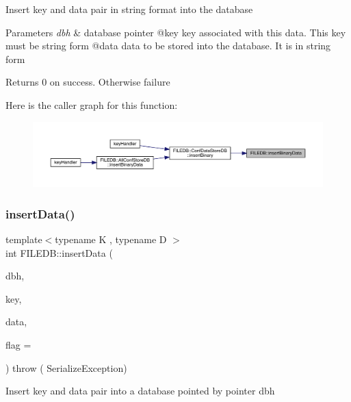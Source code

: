 Insert key and data pair in string format into the database


\begin{DoxyParams}{Parameters}
{\em dbh} & database pointer @key key associated with this data. This key must be string form @data data to be stored into the database. It is in string form\\
\hline
\end{DoxyParams}
\begin{DoxyReturn}{Returns}
0 on success. Otherwise failure 
\end{DoxyReturn}
Here is the caller graph for this function\+:
\nopagebreak
\begin{figure}[H]
\begin{center}
\leavevmode
\includegraphics[width=350pt]{d2/de6/namespaceFILEDB_a517749615adc5aa798175fb429115366_icgraph}
\end{center}
\end{figure}
\mbox{\label{namespaceFILEDB_a63f788f0f11a571f254ac8cfa8d19132}} 
\subsubsection{\texorpdfstring{insertData()}{insertData()}\hspace{0.1cm}{\footnotesize\ttfamily [1/2]}}
{\footnotesize\ttfamily template$<$typename K , typename D $>$ \\
int F\+I\+L\+E\+D\+B\+::insert\+Data (\begin{DoxyParamCaption}\item[{\mbox{\hyperlink{adat-devel_2other__libs_2filedb_2filehash_2ffdb__db_8h_a0b27b956926453a7a8141ea8e10f0df8}{F\+F\+D\+B\+\_\+\+DB}} $\ast$}]{dbh,  }\item[{const K \&}]{key,  }\item[{const D \&}]{data,  }\item[{unsigned int}]{flag = {} }\end{DoxyParamCaption}) throw ( Serialize\+Exception) }

Insert key and data pair into a database pointed by pointer dbh


